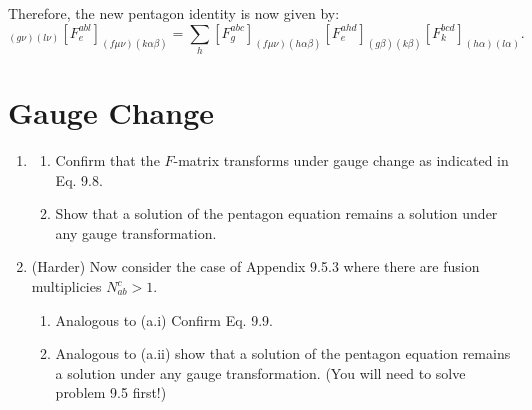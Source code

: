\documentclass{book}
\begin{document}
Therefore, the new pentagon identity is now given by:
\begin{equation}
[F_{e}^{fcd} ]_{( g\nu )( l\nu )} [F_{e}^{abl} ]_{( f\mu \nu )( k\alpha \beta )} =\sum _{h} [F_{g}^{abc} ]_{( f\mu \nu )( h\alpha \beta )} [F_{e}^{ahd} ]_{( g\beta )( k\beta )} [F_{k}^{bcd} ]_{( h\alpha )( l\alpha )} .
\label{eq:pentagonWithMultiplicity}
\end{equation}

\section{Gauge Change}

\begin{enumerate}
\item 
\begin{enumerate}
\item Confirm that the $F$-matrix transforms under gauge change as indicated in Eq. 9.8. 
\item Show that a solution of the pentagon equation remains a solution under any gauge transformation.
\end{enumerate}
\item (Harder) Now consider the case of Appendix 9.5.3 where there are fusion multiplicies $N_{ab}^{c}  >1$.
\begin{enumerate}
\item Analogous to (a.i) Confirm Eq. 9.9. 
\item Analogous to (a.ii) show that a solution of the pentagon equation remains a solution under any gauge transformation. (You will need to solve problem 9.5 first!)
\end{enumerate}
\end{enumerate}
\end{document}
